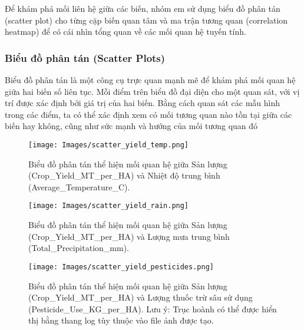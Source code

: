 Để khám phá mối liên hệ giữa các biến, nhóm em sử dụng biểu đồ phân tán (scatter plot) cho từng cặp biến quan tâm và ma trận tương quan (correlation heatmap) để có cái nhìn tổng quan về các mối quan hệ tuyến tính.

\subsubsection{Biểu đồ phân tán (Scatter Plots)}

Biểu đồ phân tán là một công cụ trực quan mạnh mẽ để khám phá mối quan hệ giữa hai biến số liên tục. Mỗi điểm trên biểu đồ đại diện cho một quan sát, với vị trí được xác định bởi giá trị của hai biến. Bằng cách quan sát các mẫu hình trong các điểm, ta có thể xác định xem có mối tương quan nào tồn tại giữa các biến hay không, cũng như sức mạnh và hướng của mối tương quan đó

\begin{figure}[htb] 
    \centering
    \texttt{[image: Images/scatter\_yield\_temp.png]} 
    \vspace{8pt}
    \caption{Biểu đồ phân tán thể hiện mối quan hệ giữa Sản lượng (Crop\_Yield\_MT\_per\_HA) và Nhiệt độ trung bình (Average\_Temperature\_C).}
    \label{fig:scatter_yield_temp} 
\end{figure}

\begin{figure}[htb] 
    \centering
    \texttt{[image: Images/scatter\_yield\_rain.png]}
    \vspace{8pt}
    \caption{Biểu đồ phân tán thể hiện mối quan hệ giữa Sản lượng (Crop\_Yield\_MT\_per\_HA) và Lượng mưa trung bình (Total\_Precipitation\_mm).}
    \label{fig:scatter_yield_rain} %
\end{figure}

\begin{figure}[htb] 
    \centering
    \texttt{[image: Images/scatter\_yield\_pesticides.png]}
    \vspace{8pt}
    \caption{Biểu đồ phân tán thể hiện mối quan hệ giữa Sản lượng (Crop\_Yield\_MT\_per\_HA) và Lượng thuốc trừ sâu sử dụng (Pesticide\_Use\_KG\_per\_HA). Lưu ý: Trục hoành có thể được hiển thị bằng thang log tùy thuộc vào file ảnh được tạo.} 
    \label{fig:scatter_yield_pesticides} %
\end{figure}

